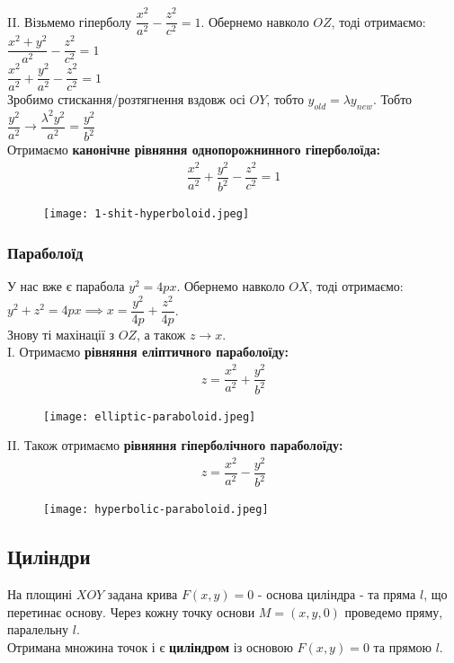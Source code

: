 \documentclass[a4paper, 10pt]{extarticle}
\theoremstyle{theoremdd}
\theoremstyle{theoremdd}
\theoremstyle{theoremdd}
\theoremstyle{theoremdd}
\theoremstyle{theoremdd}
\theoremstyle{theoremdd}
\theoremstyle{theoremdd}
\theoremstyle{theoremdd}
\begin{document}
II. Візьмемо гіперболу $\dfrac{x^2}{a^2} - \dfrac{z^2}{c^2} = 1$. Обернемо навколо $OZ$, тоді отримаємо:\\
$\dfrac{x^2+y^2}{a^2} - \dfrac{z^2}{c^2} = 1$\\
$\dfrac{x^2}{a^2} + \dfrac{y^2}{a^2} - \dfrac{z^2}{c^2} = 1$\\
Зробимо стискання/розтягнення вздовж осі $OY$, тобто $y_{old} = \lambda y_{new}$. Тобто $\dfrac{y^2}{a^2} \to \dfrac{\lambda^2 y^2}{a^2} = \dfrac{y^2}{b^2}$\\
Отримаємо \textbf{канонічне рівняння однопорожнинного гіперболоїда:}
\begin{align*}
\dfrac{x^2}{a^2} + \dfrac{y^2}{b^2} - \dfrac{z^2}{c^2} = 1
\end{align*}

\begin{figure}[H]
\centering
\texttt{[image: 1-shit-hyperboloid.jpeg]}
\end{figure}

\subsubsection{Параболоїд}
У нас вже є парабола $y^2 = 4px$. Обернемо навколо $OX$, тоді отримаємо:\\
$y^2+z^2 = 4px \implies x = \dfrac{y^2}{4p} + \dfrac{z^2}{4p}$.\\
Знову ті махінації з $OZ$, а також $z \to x$.\\
I. Отримаємо \textbf{рівняння еліптичного параболоїду:}
\begin{align*}
z = \dfrac{x^2}{a^2} + \dfrac{y^2}{b^2}
\end{align*}
\begin{figure}[H]
\centering
\texttt{[image: elliptic-paraboloid.jpeg]}
\end{figure}
II. Також отримаємо \textbf{рівняння гіперболічного параболоїду:}
\begin{align*}
z = \dfrac{x^2}{a^2} - \dfrac{y^2}{b^2}
\end{align*}

\begin{figure}[H]
\centering
\texttt{[image: hyperbolic-paraboloid.jpeg]}
\end{figure}

\subsection{Циліндри}
На площині $XOY$ задана крива $F(x,y) = 0$ - основа циліндра - та пряма $l$, що перетинає основу. Через кожну точку основи $M = (x,y,0)$ проведемо пряму, паралельну $l$.\\
Отримана множина точок і є \textbf{циліндром} із основою $F(x,y) = 0$ та прямою $l$.\\
\end{document}
